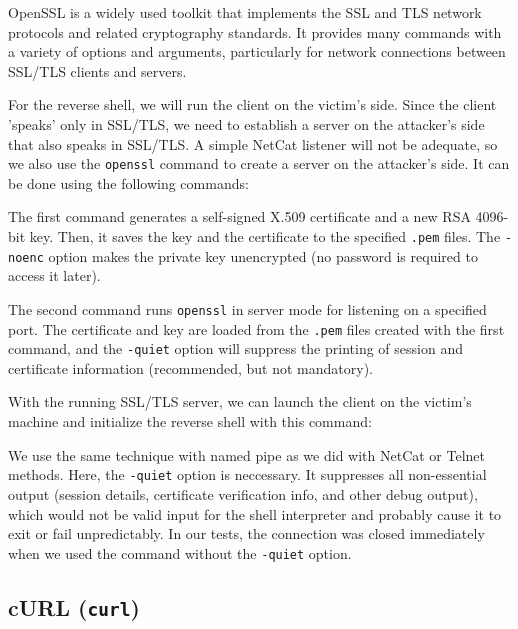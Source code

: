 
OpenSSL is a widely used toolkit that implements the SSL and TLS network protocols and related cryptography standards. It provides many commands with a variety of options and arguments, particularly for network connections between SSL/TLS clients and servers.

For the reverse shell, we will run the client on the victim's side. Since the client 'speaks' only in SSL/TLS, we need to establish a server on the attacker's side that also speaks in SSL/TLS. A simple NetCat listener will not be adequate, so we also use the \texttt{openssl} command to create a server on the attacker's side. It can be done using the following commands:


The first command generates a self-signed X.509 certificate and a new RSA 4096-bit key. Then, it saves the key and the certificate to the specified \texttt{.pem} files. The \texttt{-noenc} option makes the private key unencrypted (no password is required to access it later).

The second command runs \texttt{openssl} in server mode for listening on a specified port. The certificate and key are loaded from the \texttt{.pem} files created with the first command, and the \texttt{-quiet} option will suppress the printing of session and certificate information (recommended, but not mandatory). \cite{openssl-doc}

With the running SSL/TLS server, we can launch the client on the victim's machine and initialize the reverse shell with this command:



We use the same technique with named pipe as we did with NetCat or Telnet methods. Here, the \texttt{-quiet} option is neccessary. It suppresses all non-essential output (session details, certificate verification info, and other debug output), which would not be valid input for the shell interpreter and probably cause it to exit or fail unpredictably. In our tests, the connection was closed immediately when we used the command without the \texttt{-quiet} option.


\subsection{cURL (\texttt{curl})}


